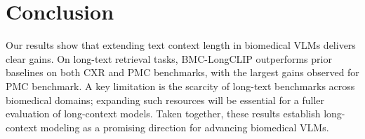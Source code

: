 \section{Conclusion}
\label{sec:conclusion}

Our results show that extending text context length in biomedical VLMs delivers clear gains.
On long-text retrieval tasks, BMC-LongCLIP outperforms prior baselines on both CXR and PMC benchmarks, with the largest gains observed for PMC benchmark.
A key limitation is the scarcity of long-text benchmarks across biomedical domains; expanding such resources will be essential for a fuller evaluation of long-context models.
Taken together, these results establish long-context modeling as a promising direction for advancing biomedical VLMs.


